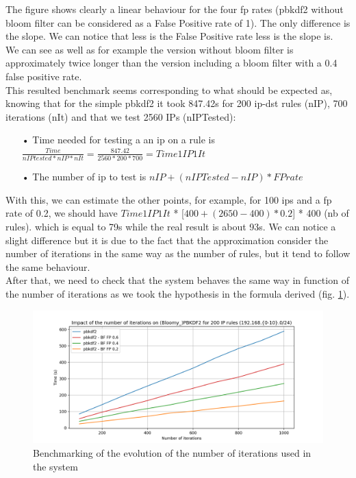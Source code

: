 \documentclass{eplmastersthesis}
\begin{document}
The figure shows clearly a linear behaviour for the four \gls{fp} rates (\gls{pbkdf2} without bloom filter can be considered as a False Positive rate of 1). The only difference is the slope. We can notice that less is the False Positive rate less is the slope is.\\
We can see as well as for example the version without bloom filter is approximately twice longer than the version including a bloom filter with a 0.4 false positive rate.\\

This resulted benchmark seems corresponding to what should be expected as, knowing that for the simple \gls{pbkdf2} it took 847.42s for 200 ip-dst rules (nIP), 700 iterations (nIt) and that we test 2560 IPs (nIPTested):
\begin{itemize}
\item[•] Time needed for testing a an \gls{ip} on a rule is $\frac{Time}{nIPtested * nIP * nIt}=\frac{847.42}{2560*200*700} = Time1IP1It$
\item[•] The number of \gls{ip} to test is $nIP + (nIPTested - nIP)*FPrate$
\end{itemize}
With this, we can estimate the other points, for example, for 100 \gls{ip}s and a \gls{fp} rate of 0.2, we should have $Time1IP1It$ *  [$400 + (2650 - 400)*0.2$] * 400 (nb of rules). which is equal to 79s while the real result is about 93s. We can notice a slight difference but it is due to the fact that the approximation consider the number of iterations in the same way as the number of rules, but it tend to follow the same behaviour.\\
After that, we need to check that the system behaves the same way in function of the number of iterations as we took the hypothesis in the formula derived (fig. \ref{benchmarking:timeiterations}). 

\begin{figure}[h!]
\begin{center}
	\includegraphics[scale=0.6]{res/TimeIterations}
	\caption{Benchmarking of the evolution of the number of iterations used in the system}
	\label{benchmarking:timeiterations}
\end{center}
\end{figure}
\end{document}
